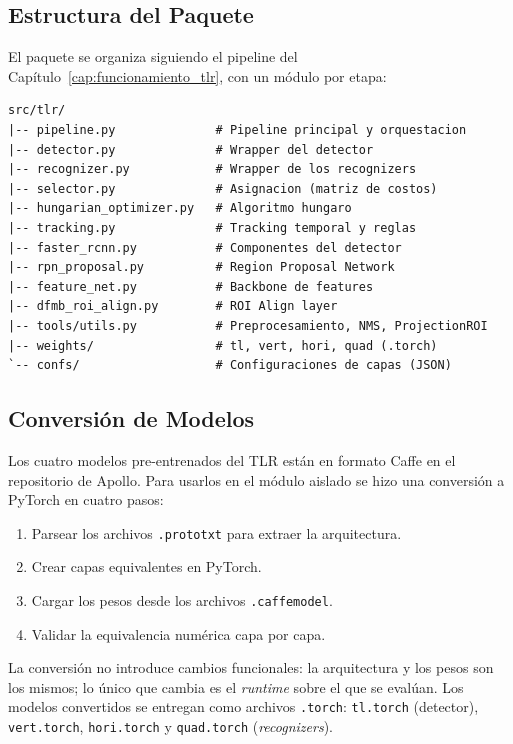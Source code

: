 \subsection{Estructura del Paquete}

El paquete se organiza siguiendo el pipeline del Capítulo~\ref{cap:funcionamiento_tlr}, con un módulo por etapa:

\begin{verbatim}
src/tlr/
|-- pipeline.py              # Pipeline principal y orquestacion
|-- detector.py              # Wrapper del detector
|-- recognizer.py            # Wrapper de los recognizers
|-- selector.py              # Asignacion (matriz de costos)
|-- hungarian_optimizer.py   # Algoritmo hungaro
|-- tracking.py              # Tracking temporal y reglas
|-- faster_rcnn.py           # Componentes del detector
|-- rpn_proposal.py          # Region Proposal Network
|-- feature_net.py           # Backbone de features
|-- dfmb_roi_align.py        # ROI Align layer
|-- tools/utils.py           # Preprocesamiento, NMS, ProjectionROI
|-- weights/                 # tl, vert, hori, quad (.torch)
`-- confs/                   # Configuraciones de capas (JSON)
\end{verbatim}

\subsection{Conversión de Modelos}

Los cuatro modelos pre-entrenados del TLR están en formato Caffe en el repositorio de Apollo. Para usarlos en el módulo aislado se hizo una conversión a PyTorch en cuatro pasos:

\begin{enumerate}
    \item Parsear los archivos \texttt{.prototxt} para extraer la arquitectura.
    \item Crear capas equivalentes en PyTorch.
    \item Cargar los pesos desde los archivos \texttt{.caffemodel}.
    \item Validar la equivalencia numérica capa por capa.
\end{enumerate}

La conversión no introduce cambios funcionales: la arquitectura y los pesos son los mismos; lo único que cambia es el \textit{runtime} sobre el que se evalúan. Los modelos convertidos se entregan como archivos \texttt{.torch}: \texttt{tl.torch} (detector), \texttt{vert.torch}, \texttt{hori.torch} y \texttt{quad.torch} (\textit{recognizers}).

